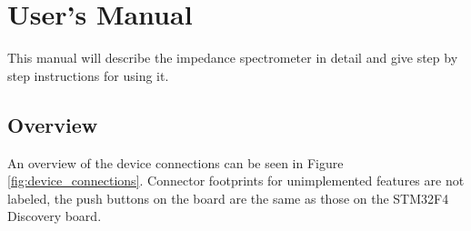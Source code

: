 \chapter{User's Manual} \label{sec:manual}

This manual will describe the impedance spectrometer in detail and give step by step instructions for using it.


\section{Overview}

An overview of the device connections can be seen in Figure \ref{fig:device_connections}. Connector footprints for
unimplemented features are not labeled, the push buttons on the board are the same as those on the
STM32F4 Discovery board.

